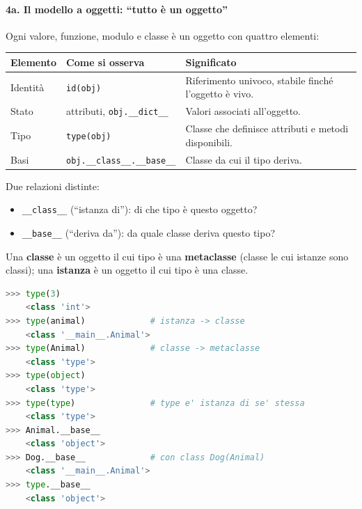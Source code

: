\documentclass[12pt]{extarticle}
\begin{document}
\paragraph{4a. Il modello a oggetti: ``tutto è un oggetto''} Ogni valore, funzione, modulo e classe è un oggetto con quattro elementi:
\begin{center}
\small
\begin{tabular}{p{3.0cm}p{5.0cm}p{6.6cm}}
    \toprule
    \textbf{Elemento} & \textbf{Come si osserva} & \textbf{Significato} \\
    \midrule
    Identità & \texttt{id(obj)} & Riferimento univoco, stabile finché l'oggetto è vivo. \\
    \addlinespace
    Stato & attributi, \texttt{obj.\_\_dict\_\_} & Valori associati all'oggetto. \\
    \addlinespace
    Tipo & \texttt{type(obj)} & Classe che definisce attributi e metodi disponibili. \\
    \addlinespace
    Basi & \texttt{obj.\_\_class\_\_.\_\_base\_\_} & Classe da cui il tipo deriva. \\
    \bottomrule
\end{tabular}
\end{center}
Due relazioni distinte:
\begin{itemize}
    \item \texttt{\_\_class\_\_} (``istanza di''): di che tipo è questo oggetto?
    \item \texttt{\_\_base\_\_} (``deriva da''): da quale classe deriva questo tipo?
\end{itemize}
Una \textbf{classe} è un oggetto il cui tipo è una \textbf{metaclasse} (classe le cui istanze sono classi); una \textbf{istanza} è un oggetto il cui tipo è una classe.
\begin{lstlisting}[language=Python]
>>> type(3)
    <class 'int'>
>>> type(animal)             # istanza -> classe
    <class '__main__.Animal'>
>>> type(Animal)             # classe -> metaclasse
    <class 'type'>
>>> type(object)
    <class 'type'>
>>> type(type)               # type e' istanza di se' stessa
    <class 'type'>
>>> Animal.__base__
    <class 'object'>
>>> Dog.__base__             # con class Dog(Animal)
    <class '__main__.Animal'>
>>> type.__base__
    <class 'object'>
\end{lstlisting}
\end{document}
